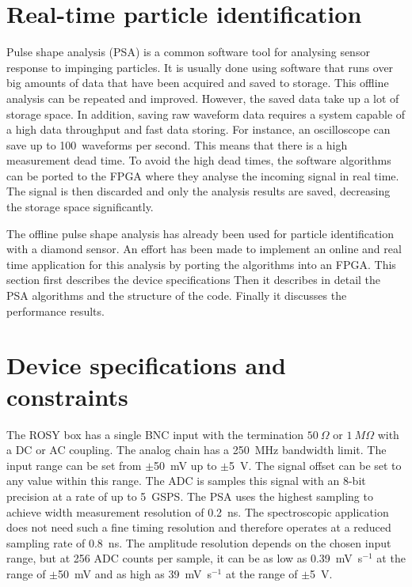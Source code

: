 \documentclass[12pt]{mytustyle}  %
\begin{document}
\section{Real-time particle identification}
\label{sec:rtpi}
Pulse shape analysis (PSA) is a common software tool for analysing sensor response to impinging particles. It is usually done using software that runs over big amounts of data that have been acquired and saved to storage. This offline analysis can be repeated and improved. However, the saved data take up a lot of storage space. In addition, saving raw waveform data requires a system capable of a high data throughput and fast data storing. For instance, an oscilloscope can save up to 100~waveforms per second. This means that there is a high measurement dead time. To avoid the high dead times, the software algorithms can be ported to the FPGA where they analyse the incoming signal in real time. The signal is then discarded and only the analysis results are saved, decreasing the storage space significantly.

The offline pulse shape analysis has already been used for particle identification with a diamond sensor. An effort has been made to implement an online and real time application for this analysis by porting the algorithms into an FPGA. This section first describes the device specifications Then it describes in detail the PSA algorithms and the structure of the code. Finally it discusses the performance results.



\section{Device specifications and constraints}
The ROSY box has a single BNC input with the termination $50~\Omega$ or $1~M\Omega$ with a DC or AC coupling. The analog chain has a 250~MHz bandwidth limit. The input range can be set from $\pm$50~mV up to $\pm$5~V. The signal offset can be set to any value within this range. The ADC is samples this signal with an 8-bit precision at a rate of up to 5~GSPS. The PSA uses the highest sampling to achieve width measurement resolution of 0.2~ns. The spectroscopic application does not need such a fine timing resolution and therefore operates at a reduced sampling rate of 0.8~ns. The amplitude resolution depends on the chosen input range, but at 256 ADC counts per sample, it can be as low as 0.39~mV~s$^{-1}$ at the range of $\pm$50~mV and as high as 39~mV~s$^{-1}$ at the range of $\pm$5~V.
\end{document}

